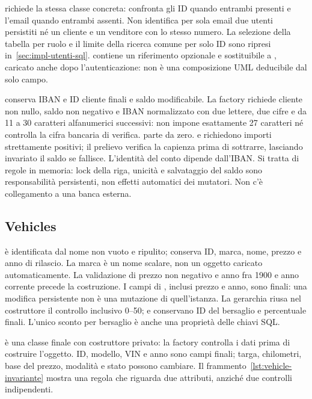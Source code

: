  richiede la stessa classe concreta: confronta gli ID quando
entrambi presenti e l'email quando entrambi assenti. Non identifica per
sola email due utenti persistiti né un cliente e un venditore con lo stesso
numero. La selezione della tabella per ruolo e il limite della ricerca
comune per solo ID sono ripresi in~\ref{sec:impl-utenti-sql}.
 contiene un riferimento opzionale e sostituibile a
, caricato anche dopo l'autenticazione: non è una
composizione UML deducibile dal solo campo.

 conserva IBAN e ID cliente finali e saldo modificabile.
La factory richiede cliente non nullo, saldo non negativo e IBAN normalizzato
con due lettere, due cifre e da 11 a 30 caratteri alfanumerici successivi:
non impone esattamente 27 caratteri né controlla la cifra bancaria di verifica.
 parte da zero.  e 
richiedono importi strettamente positivi; il prelievo verifica la capienza
prima di sottrarre, lasciando invariato il saldo se fallisce. L'identità
del conto dipende dall'IBAN. Si tratta di regole in memoria: lock della riga,
unicità e salvataggio del saldo sono responsabilità persistenti, non effetti
automatici dei mutatori. Non c'è collegamento a una banca esterna.

\subsection{Vehicles}
 è identificata dal nome non vuoto e ripulito;
 conserva ID, marca, nome, prezzo e anno di rilascio.
La marca è un nome scalare, non un oggetto caricato automaticamente.
La validazione di prezzo non negativo e anno fra 1900 e anno corrente
precede la costruzione. I campi di , inclusi prezzo e anno,
sono finali: una modifica persistente non è una mutazione di quell'istanza. La gerarchia 
riusa nel costruttore il controllo inclusivo 0--50; 
e  conservano ID del bersaglio e percentuale finali.
L'unico sconto per bersaglio è anche una proprietà delle chiavi SQL.

 è una classe finale con costruttore privato: la factory
 controlla i dati prima di costruire l'oggetto. ID, modello,
VIN e anno sono campi finali; targa, chilometri, base del prezzo, modalità
e stato possono cambiare. Il frammento~\ref{lst:vehicle-invariante}
mostra una regola che riguarda due attributi, anziché due controlli
indipendenti.

